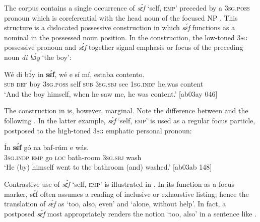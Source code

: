 \ea%
    \label{ex:key:663}
\z\z

The corpus contains a single occurrence of \textit{sɛ́f} ‘self, \textsc{emp}’ preceded by a \textsc{3sg.poss} pronoun which is coreferential with the head noun of the focused NP . This structure is a dislocated possessive construction{\fff} in which \textit{sɛ́f} functions as a nominal in the possessed noun position. In the construction, the low-toned \textsc{3sg} possessive pronoun and \textit{sɛ́f} together signal emphasis or focus of the preceding noun \textit{di bɔ́y} ‘the boy’:


\ea%
    \label{ex:key:664}
    \gll Wé  di  bɔ́y  in    \textbf{sɛ́f},  wé  e    sí  mí,
estaba  contento.\\
\textsc{sub}  \textsc{def}  boy  \textsc{3sg.poss}  self  \textsc{sub}  \textsc{3sg.sbj}  see  \textsc{1sg.indp}
he.was  content\\

\glt ‘And the boy himself, when he saw me, he was content.’ [ab03ay 046]
\z

The construction in  is, however, marginal. Note the difference between  and the following . In the latter example, \textit{sɛ́f} ‘self, \textsc{emp}’ is used as a regular focus particle, postposed to the high-toned \textsc{3sg} emphatic personal pronoun: 


\ea%
    \label{ex:key:665}
    \gll \'{I}n    \textbf{sɛ́f}  gó  na  baf-rúm    e    wás.\\
\textsc{3sg.indp}  \textsc{emp}  go  \textsc{loc}  bath-room  \textsc{3sg.sbj}  wash\\

\glt ‘He (by) himself went to the bathroom (and) washed.’ [ab03ab 148]
\z

Contrastive use of \textit{sɛ́f} ‘self, \textsc{emp}’ is illustrated in . In its function as a focus marker, sɛ́f often assumes a reading of inclusive or exhaustive listing; hence the translation of \textit{sɛ́f} as ‘too, also, even’ and ‘alone, without help’. In fact, a postposed \textit{sɛ́f} most appropriately renders the notion ‘too, also’ in a sentence like . {\fff}


